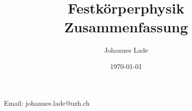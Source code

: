 \documentclass[10pt,a4paper]{article}
\author{Johannes Lade}
\title{Festkörperphysik Zusammenfassung}
\date{\today{}}
\begin{document}
	
\begin{titlepage}
	\maketitle
		\begin{center}
			Email: johannes.lade@uzh.ch
		\end{center}
	\thispagestyle{empty}
\end{titlepage}

\tableofcontents
\newpage
	
	







	
\end{document}

